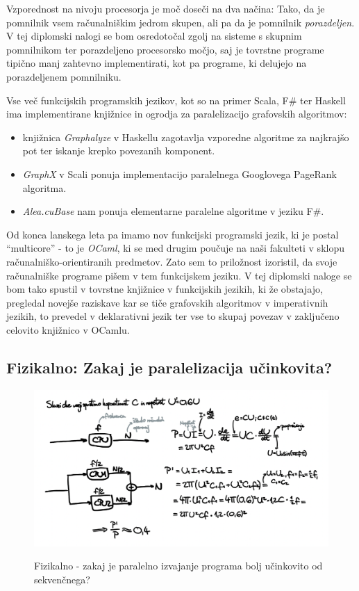 \documentclass[mat1, tisk]{fmfdelo}
\begin{document}
Vzporednost na nivoju procesorja je moč doseči na dva načina: 
Tako, da je pomnilnik vsem računalniškim jedrom skupen, ali pa da je pomnilnik \textit{porazdeljen}. 
V tej diplomski nalogi se bom osredotočal zgolj na sisteme s skupnim pomnilnikom ter porazdeljeno procesorsko močjo, 
saj je tovrstne programe tipično manj zahtevno implementirati, kot pa programe, ki delujejo na porazdeljenem pomnilniku.

Vse več funkcijskih programskih jezikov, kot so na primer Scala, F\# ter Haskell ima implementirane knjižnice
in ogrodja za paralelizacijo grafovskih algoritmov:
\begin{itemize}
    \item knjižnica \textit{Graphalyze} v Haskellu zagotavlja vzporedne algoritme za najkrajšo pot 
    ter iskanje krepko povezanih komponent.
    \item \textit{GraphX} v Scali ponuja implementacijo paralelnega Googlovega PageRank algoritma.
    \item \textit{Alea.cuBase} nam ponuja elementarne paralelne algoritme v jeziku F\#.
\end{itemize}

Od konca lanskega leta pa imamo nov funkcijski programski jezik, ki je postal ``multicore'' - to je \textit{OCaml},
ki se med drugim poučuje na naši fakulteti v sklopu računalniško-orientiranih predmetov. 
Zato sem to priložnost izoristil, da svoje računalniške programe pišem v tem funkcijskem jeziku. 
V tej diplomski naloge se bom tako spustil v tovrstne knjižnice v funkcijskih jezikih, ki že obstajajo, 
pregledal novejše raziskave kar se tiče grafovskih algoritmov v imperativnih jezikih, 
to prevedel v deklarativni jezik ter vse to skupaj povezav v zaključeno celovito knjižnico v OCamlu.

\subsection{Fizikalno: Zakaj je paralelizacija učinkovita?}

\begin{figure}[h!]
  \centering
  \caption{Fizikalno - zakaj je paralelno izvajanje programa bolj učinkovito od sekvenčnega?}
  \includegraphics[width=13cm]{slike/paralelizacija-fizikalno.png}
  \label{fig:fib_par_v_odvisnosti_od_domen}
\end{figure}
\end{document}
